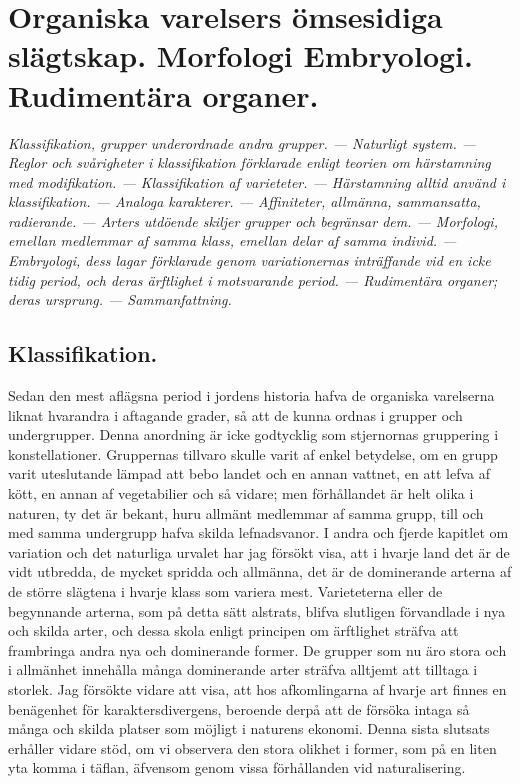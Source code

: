 


\chapter[Varelsers ömsesidiga slägtskap]{Organiska varelsers ömsesidiga slägtskap. Morfologi
Embryologi. Rudimentära organer.}

{\it
Klassifikation, grupper underordnade andra grupper. — Naturligt system. — Reglor och svårigheter i klassifikation förklarade enligt teorien om härstamning med modifikation. — Klassifikation af varieteter. — Härstamning alltid använd i klassifikation. — Analoga karakterer. — Affiniteter, allmänna, sammansatta, radierande. — Arters utdöende skiljer grupper och begränsar dem. — Morfologi, emellan medlemmar af samma klass, emellan delar af samma individ. — Embryologi, dess lagar förklarade genom variationernas inträffande vid en icke tidig period, och deras ärftlighet i motsvarande period. — Rudimentära organer; deras ursprung. — Sammanfattning.
}\\[0.5cm]


\section{Klassifikation.}

Sedan den mest aflägsna period i jordens historia hafva de organiska varelserna liknat hvarandra i aftagande grader, så att de kunna ordnas i grupper och undergrupper. Denna anordning är icke godtycklig som stjernornas gruppering i konstellationer. Gruppernas tillvaro skulle varit af enkel betydelse, om en grupp varit uteslutande lämpad att bebo landet och en annan vattnet, en att lefva af kött, en annan af vegetabilier och så vidare; men förhållandet är helt olika i naturen, ty det är bekant, huru allmänt medlemmar af samma grupp, till och med samma undergrupp hafva skilda lefnadsvanor. I andra och fjerde kapitlet om variation och det naturliga urvalet har jag försökt visa, att i hvarje land det är de vidt utbredda, de mycket spridda och allmänna, det är de dominerande arterna af de större slägtena i hvarje klass som variera mest. Varieteterna eller de begynnande arterna, som på detta sätt alstrats, blifva slutligen förvandlade i nya och skilda arter, och dessa skola enligt principen om ärftlighet sträfva att frambringa andra nya och dominerande former. De grupper som nu äro stora och i allmänhet innehålla många dominerande arter sträfva alltjemt att tilltaga i storlek. Jag försökte vidare att visa, att hos afkomlingarna af hvarje art finnes en benägenhet för karaktersdivergens, beroende derpå att de försöka intaga så många och skilda platser som möjligt i naturens ekonomi. Denna sista slutsats erhåller vidare stöd, om vi observera den stora olikhet i former, som på en liten yta komma i täflan, äfvensom genom vissa förhållanden vid naturalisering.

